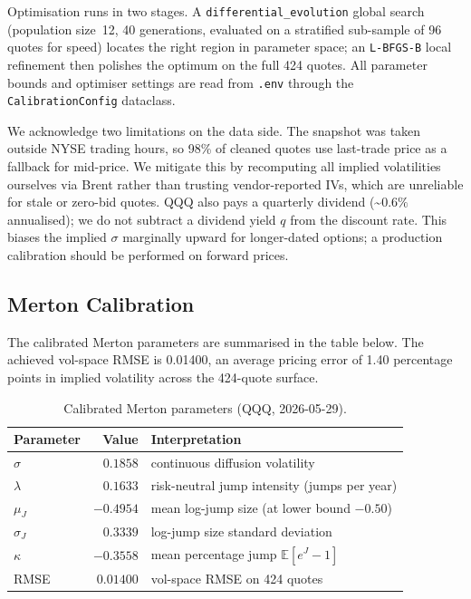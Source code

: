 Optimisation runs in two stages. A \texttt{differential\_evolution}
global search (population size~12, 40 generations, evaluated on a
stratified sub-sample of 96 quotes for speed) locates the right region
in parameter space; an \texttt{L-BFGS-B} local refinement then polishes
the optimum on the full 424 quotes. All parameter bounds and optimiser
settings are read from \texttt{.env} through the
\texttt{CalibrationConfig} dataclass.

We acknowledge two limitations on the data side. The snapshot was taken
outside NYSE trading hours, so 98\% of cleaned quotes use last-trade
price as a fallback for mid-price. We mitigate this by recomputing all
implied volatilities ourselves via Brent rather than trusting
vendor-reported IVs, which are unreliable for stale or zero-bid quotes.
QQQ also pays a quarterly dividend (\textasciitilde$0.6\%$ annualised);
we do not subtract a dividend yield $q$ from the discount rate. This
biases the implied $\sigma$ marginally upward for longer-dated options;
a production calibration should be performed on forward prices.


\subsection*{Merton Calibration}

The calibrated Merton parameters are summarised in the table below.
The achieved vol-space RMSE is 0.01400, an average pricing error of
1.40 percentage points in implied volatility across the 424-quote
surface.

\begin{table}[H]
\centering
\caption{Calibrated Merton parameters (QQQ, 2026-05-29).}
\begin{tabular}{lrl}
\toprule
Parameter      & Value     & Interpretation \\
\midrule
$\sigma$       & $0.1858$  & continuous diffusion volatility \\
$\lambda$      & $0.1633$  & risk-neutral jump intensity (jumps per year) \\
$\mu_J$        & $-0.4954$ & mean log-jump size (at lower bound $-0.50$) \\
$\sigma_J$     & $0.3339$  & log-jump size standard deviation \\
$\kappa$       & $-0.3558$ & mean percentage jump $\mathbb{E}[e^J - 1]$ \\
RMSE           & $0.01400$ & vol-space RMSE on 424 quotes \\
\bottomrule
\end{tabular}
\end{table}

